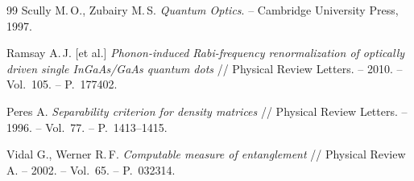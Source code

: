 \documentclass[11pt]{article}    %
\numberwithin{equation}{section}
\begin{document}
\begin{thebibliography}{99}
Scully M.\,O., Zubairy M.\,S. \textit{Quantum Optics}. -- Cambridge University Press, 1997.

Ramsay A.\,J. [et al.] \textit{Phonon-induced Rabi-frequency renormalization of optically driven single InGaAs/GaAs quantum dots} // Physical Review Letters. -- 2010. -- Vol.~105. -- P.~177402.

Peres A. \textit{Separability criterion for density matrices} // Physical Review Letters. -- 1996. -- Vol.~77. -- P.~1413--1415.

Vidal G., Werner R.\,F. \textit{Computable measure of entanglement} // Physical Review A. -- 2002. -- Vol.~65. -- P.~032314.

\end{thebibliography}
\end{document}
